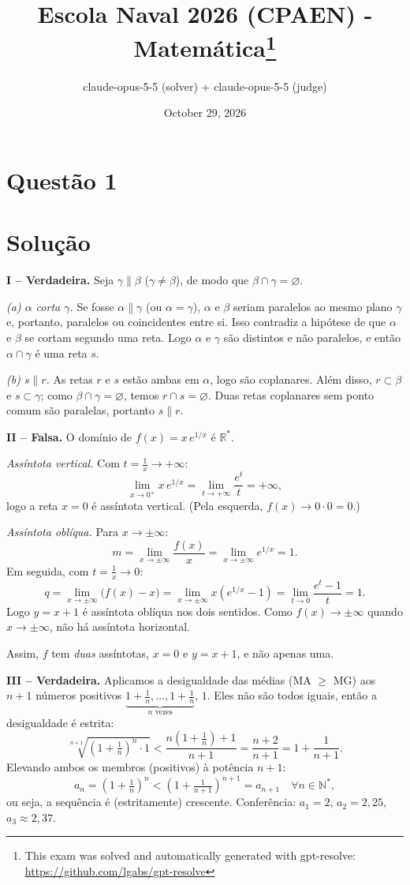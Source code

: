 \documentclass{article}%
\title{Escola Naval 2026 (CPAEN) - Matemática\thanks{This exam was solved and automatically generated with gpt-resolve: \url{https://github.com/lgabs/gpt-resolve}}}%
\author{claude{-}opus{-}5{-}5 (solver) + claude{-}opus{-}5{-}5 (judge)}%
\date{October 29, 2026}%
\begin{document}
%
\normalsize%
\maketitle%
\section*{Questão 1}

\section*{Solução}

\textbf{I -- Verdadeira.} Seja $\gamma\parallel\beta$ ($\gamma\neq\beta$), de modo que $\beta\cap\gamma=\varnothing$.

\emph{(a) $\alpha$ corta $\gamma$.} Se fosse $\alpha\parallel\gamma$ (ou $\alpha=\gamma$), $\alpha$ e $\beta$ seriam paralelos ao mesmo plano $\gamma$ e, portanto, paralelos ou coincidentes entre si. Isso contradiz a hipótese de que $\alpha$ e $\beta$ se cortam segundo uma reta. Logo $\alpha$ e $\gamma$ são distintos e não paralelos, e então $\alpha\cap\gamma$ é uma reta $s$.

\emph{(b) $s\parallel r$.} As retas $r$ e $s$ estão ambas em $\alpha$, logo são coplanares. Além disso, $r\subset\beta$ e $s\subset\gamma$; como $\beta\cap\gamma=\varnothing$, temos $r\cap s=\varnothing$. Duas retas coplanares sem ponto comum são paralelas, portanto $s\parallel r$.

\medskip
\textbf{II -- Falsa.} O domínio de $f(x)=x\,e^{1/x}$ é $\mathbb{R}^*$.

\emph{Assíntota vertical.} Com $t=\frac1x\to+\infty$:
\[
\lim_{x\to0^+} x\,e^{1/x}=\lim_{t\to+\infty}\frac{e^t}{t}=+\infty ,
\]
logo a reta $x=0$ é assíntota vertical. (Pela esquerda, $f(x)\to0\cdot 0=0$.)

\emph{Assíntota oblíqua.} Para $x\to\pm\infty$:
\[
m=\lim_{x\to\pm\infty}\frac{f(x)}{x}=\lim_{x\to\pm\infty} e^{1/x}=1 .
\]
Em seguida, com $t=\frac1x\to0$:
\[
q=\lim_{x\to\pm\infty}\bigl(f(x)-x\bigr)=\lim_{x\to\pm\infty}x\left(e^{1/x}-1\right)=\lim_{t\to0}\frac{e^t-1}{t}=1 .
\]
Logo $y=x+1$ é assíntota oblíqua nos dois sentidos. Como $f(x)\to\pm\infty$ quando $x\to\pm\infty$, não há assíntota horizontal.

Assim, $f$ tem \emph{duas} assíntotas, $x=0$ e $y=x+1$, e não apenas uma.

\medskip
\textbf{III -- Verdadeira.} Aplicamos a desigualdade das médias (MA $\ge$ MG) aos $n+1$ números positivos $\underbrace{1+\tfrac1n,\dots,1+\tfrac1n}_{n\text{ vezes}},\,1$. Eles não são todos iguais, então a desigualdade é estrita:
\[
\sqrt[n+1]{\left(1+\tfrac1n\right)^n\cdot 1}<\frac{n\left(1+\frac1n\right)+1}{n+1}=\frac{n+2}{n+1}=1+\frac{1}{n+1}.
\]
Elevando ambos os membros (positivos) à potência $n+1$:
\[
a_n=\left(1+\tfrac1n\right)^n<\left(1+\tfrac1{n+1}\right)^{n+1}=a_{n+1}\quad\forall n\in\mathbb{N}^*,
\]
ou seja, a sequência é (estritamente) crescente. Conferência: $a_1=2$, $a_2=2{,}25$, $a_3\approx2{,}37$.
\end{document}
